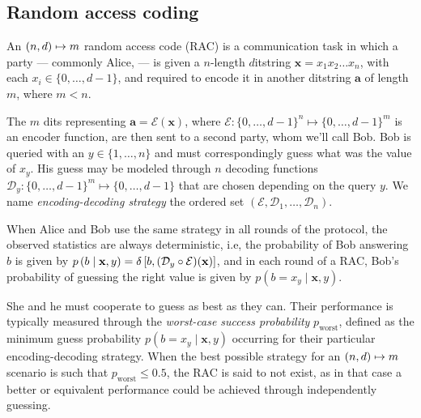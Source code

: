         \subsection{Random access coding}

            An $\left( n, d \right) \mapsto m$ random access code (RAC) is a communication task in which a party --- commonly Alice, --- is given a $n$-length $d$itstring $\mathbf{x} = x_1 x_2 \ldots x_n$, with each $x_i \in \{0, \ldots, d - 1 \}$, and required to encode it in another ditstring $\mathbf{a}$ of length $m$, where $m < n$.

            The $m$ dits representing $\mathbf{a} = \mathcal{E}(\mathbf{x})$, where $\mathcal{E} : \{0, \ldots, d - 1\}^n \mapsto \{0, \ldots, d - 1\}^m$ is an encoder function, are then sent to a second party, whom we'll call Bob. Bob is queried with an $y \in \{1, \ldots, n\}$ and must correspondingly guess what was the value of $x_y$. His guess may be modeled through $n$ decoding functions $\mathcal{D}_y : \{0, \ldots, d - 1\}^m \mapsto \{0, \ldots, d - 1\}$ that are chosen depending on the query $y$. We name \textit{encoding-decoding strategy} the ordered set $(\mathcal{E}, \mathcal{D}_{1},\ldots,\mathcal{D}_{n})$.

            When Alice and Bob use the same strategy in all rounds of the protocol, the observed statistics are always deterministic, i.e, the probability of Bob answering $b$ is given by $p \left( b \mid \mathbf{x}, y \right) = \delta\left[b, (\mathcal{D}_{y} \circ \mathcal{E})(\mathbf{x})\right]$, and in each round of a RAC, Bob's probability of guessing the right value is given by $p(b = x_y \mid \mathbf{x}, y)$.

            She and he must cooperate to guess as best as they can. Their performance is typically measured through the \emph{worst-case success probability} $p_{\text{worst}}$, defined as the minimum guess probability $p(b = x_y \mid \mathbf{x}, y)$ occurring for their particular encoding-decoding strategy. When the best possible strategy for an $\left( n, d \right) \mapsto m$ scenario is such that $p_{\text{worst}} \leq 0.5$, the RAC is said to not exist, as in that case a better or equivalent performance could be achieved through independently guessing.

